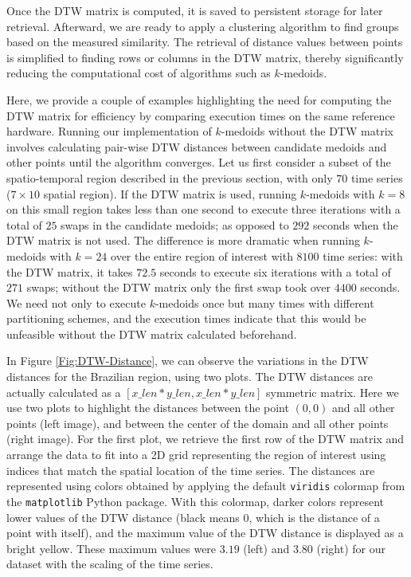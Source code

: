Once the DTW matrix is computed, it is saved to persistent storage for later retrieval. Afterward, we are ready to apply a clustering algorithm to find groups based on the measured similarity. The retrieval of distance values between points is simplified to finding rows or columns in the DTW matrix, thereby significantly reducing the computational cost of algorithms such as $k$-medoids.

Here, we provide a couple of examples highlighting the need for computing the DTW matrix for efficiency by comparing execution times on the same reference hardware. Running our implementation of $k$-medoids without the DTW matrix involves calculating pair-wise DTW distances between candidate medoids and other points until the algorithm converges. Let us first consider a subset of the spatio-temporal region described in the previous section, with only $70$ time series ($7 \times 10$ spatial region). If the DTW matrix is used, running $k$-medoids with $k=8$ on this small region takes less than one second to execute three iterations with a total of $25$ swaps in the candidate medoids; as opposed to $292$ seconds when the DTW matrix is not used. The difference is more dramatic when running $k$-medoids with $k=24$ over the entire region of interest with $8100$ time series: with the DTW matrix, it takes $72.5$ seconds to execute six iterations with a total of $271$ swaps; without the DTW matrix only the first swap took over $4400$ seconds. We need not only to execute $k$-medoids once but many times with different partitioning schemes, and the execution times indicate that this would be unfeasible without the DTW matrix calculated beforehand.

In Figure \ref{Fig:DTW-Distance}, we can observe the variations in the DTW distances for the Brazilian region, using two plots. The DTW distances are actually calculated as a $[x\_len * y\_len, x\_len * y\_len]$ symmetric matrix. Here we use two plots to highlight the distances between the point $(0, 0)$ and all other points (left image), and between the center of the domain and all other points (right image). For the first plot, we retrieve the first row of the DTW matrix and arrange the data to fit into a 2D grid representing the region of interest using indices that match the spatial location of the time series. The distances are represented using colors obtained by applying the default \texttt{viridis} colormap from the \texttt{matplotlib} Python package. With this colormap, darker colors represent lower values of the DTW distance (black means 0, which is the distance of a point with itself), and the maximum value of the DTW distance is displayed as a bright yellow. These maximum values were $3.19$ (left) and $3.80$ (right) for our dataset with the scaling of the time series.

